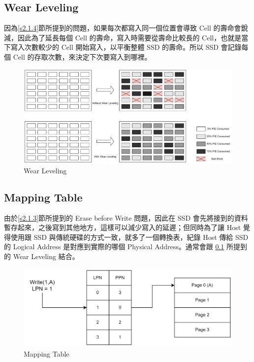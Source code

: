 \subsection{Wear Leveling}\label{s2.2.1}
\indent
因為\ref{s2.1.4}節所提到的問題，如果每次都寫入同一個位置會導致 Cell 的壽命會銳減，因此為了延長每個 Cell 的壽命，寫入時需要從壽命比較長的 Cell，也就是當下寫入次數較少的 Cell 開始寫入，以平衡整體 SSD 的壽命。所以 SSD 會記錄每個 Cell 的存取次數，來決定下次要寫入到哪裡。\cite{Wear_Leveling_Thesis}
\begin{figure}[H]
    \centering
    \includegraphics[width=1\textwidth]{picture/ch2/Wear_Leveling.png}
    \caption{Wear Leveling\cite{Wear_Leveling_Pic}}
    \label{f2.5}
\end{figure}

\subsection{Mapping Table}\label{s2.2.2}
\indent
由於\ref{s2.1.3}節所提到的 Erase before Write 問題，因此在 SSD 會先將接到的資料暫存起來，之後寫到其他地方，這樣可以減少寫入的延遲；但同時為了讓 Host 覺得使用跟 SSD 與傳統硬碟的方式一致，就多了一個轉換表，紀錄 Host 傳給 SSD的 Logical Address 是對應到實際的哪個 Physical Address。通常會跟 \ref{s2.2.1} 所提到的 Wear Leveling 結合。
\begin{figure}[H]
    \centering
    \includegraphics[width=1\textwidth]{picture/ch2/mapping_table.png}
    \caption{Mapping Table\cite{Mapping_Table}}
    \label{f2.6}
\end{figure}

